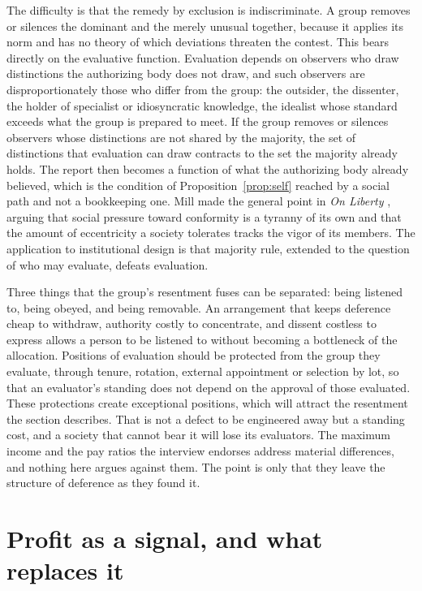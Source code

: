 \documentclass[12pt]{article}
\theoremstyle{definition}
\begin{document}
The difficulty is that the remedy by exclusion is indiscriminate. A group removes or silences the dominant and the merely unusual together, because it applies its norm and has no theory of which deviations threaten the contest. This bears directly on the evaluative function. Evaluation depends on observers who draw distinctions the authorizing body does not draw, and such observers are disproportionately those who differ from the group: the outsider, the dissenter, the holder of specialist or idiosyncratic knowledge, the idealist whose standard exceeds what the group is prepared to meet. If the group removes or silences observers whose distinctions are not shared by the majority, the set of distinctions that evaluation can draw contracts to the set the majority already holds. The report then becomes a function of what the authorizing body already believed, which is the condition of Proposition~\ref{prop:self} reached by a social path and not a bookkeeping one. Mill made the general point in \emph{On Liberty} \cite{mill1859}, arguing that social pressure toward conformity is a tyranny of its own and that the amount of eccentricity a society tolerates tracks the vigor of its members. The application to institutional design is that majority rule, extended to the question of who may evaluate, defeats evaluation.

Three things that the group's resentment fuses can be separated: being listened to, being obeyed, and being removable. An arrangement that keeps deference cheap to withdraw, authority costly to concentrate, and dissent costless to express allows a person to be listened to without becoming a bottleneck of the allocation. Positions of evaluation should be protected from the group they evaluate, through tenure, rotation, external appointment or selection by lot, so that an evaluator's standing does not depend on the approval of those evaluated. These protections create exceptional positions, which will attract the resentment the section describes. That is not a defect to be engineered away but a standing cost, and a society that cannot bear it will lose its evaluators. The maximum income and the pay ratios the interview endorses address material differences, and nothing here argues against them. The point is only that they leave the structure of deference as they found it.

\section{Profit as a signal, and what replaces it}
\end{document}
